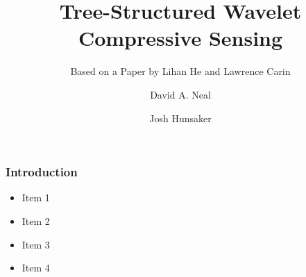 \documentclass{beamer}
\title[Tree-Structured Wavelet CS]
{Tree-Structured Wavelet Compressive Sensing}
\subtitle{Based on a Paper by Lihan He and Lawrence Carin}
\author
{David A. Neal \and Josh Hunsaker}
\institute [USU]%
{
  Advanced Digital Signal Processing  \\
  Electrical and Computer Engineering Dept. \\
  Utah State University \\[3em]
%
\texttt{[image: idllogo3]}
}
\date[] {}
\begin{document}
\maketitle

\begin{frame}
  \frametitle{Introduction}
  \begin{itemize}
  \item Item 1
  \item Item 2
  \item Item 3
  \item Item 4
  \end{itemize}
\end{frame}
\end{document}

